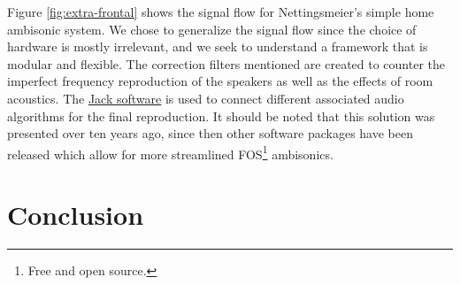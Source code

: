Figure \ref{fig:extra-frontal} shows the signal flow for Nettingsmeier's simple home ambisonic system. We chose to generalize the signal flow since the choice of hardware is mostly irrelevant, and we seek to understand a framework that is modular and flexible. The correction filters mentioned are created to counter the imperfect frequency reproduction of the speakers as well as the effects of room acoustics. The \href{https://jackaudio.org/}{Jack software} is used to connect different associated audio algorithms for the final reproduction. It should be noted that this solution was presented over ten years ago, since then other software packages have been released which allow for more streamlined FOS\footnote{Free and open source.} ambisonics. 


\section{Conclusion}